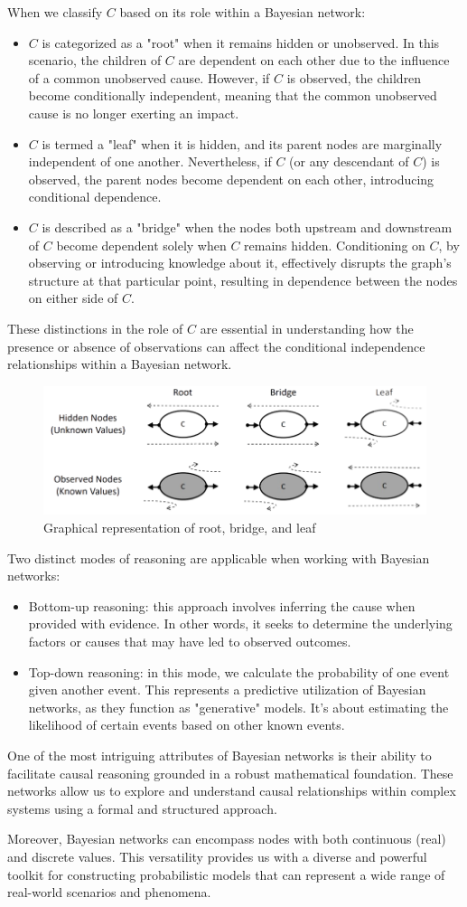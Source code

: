 When we classify $C$ based on its role within a Bayesian network:
\begin{itemize}
    \item $C$ is categorized as a "root" when it remains hidden or unobserved. 
        In this scenario, the children of $C$ are dependent on each other due to the influence of a common unobserved cause. 
        However, if $C$ is observed, the children become conditionally independent, meaning that the common unobserved cause is no longer exerting an impact.
    \item $C$ is termed a "leaf" when it is hidden, and its parent nodes are marginally independent of one another. 
        Nevertheless, if $C$ (or any descendant of $C$) is observed, the parent nodes become dependent on each other, introducing conditional dependence.
    \item $C$ is described as a "bridge" when the nodes both upstream and downstream of $C$ become dependent solely when $C$ remains hidden. 
        Conditioning on $C$, by observing or introducing knowledge about it, effectively disrupts the graph's structure at that particular point, resulting in dependence between the nodes on either side of $C$.
\end{itemize}
These distinctions in the role of $C$ are essential in understanding how the presence or absence of observations can affect the conditional independence relationships within a Bayesian network.
\begin{figure}[H]
    \centering
    \includegraphics[width=0.75\linewidth]{images/def.png}
    \caption{Graphical representation of root, bridge, and leaf}
\end{figure}

Two distinct modes of reasoning are applicable when working with Bayesian networks:
\begin{itemize}
    \item Bottom-up reasoning: this approach involves inferring the cause when provided with evidence. 
        In other words, it seeks to determine the underlying factors or causes that may have led to observed outcomes.
    \item Top-down reasoning: in this mode, we calculate the probability of one event given another event. 
        This represents a predictive utilization of Bayesian networks, as they function as "generative" models. 
        It's about estimating the likelihood of certain events based on other known events.
\end{itemize}
One of the most intriguing attributes of Bayesian networks is their ability to facilitate causal reasoning grounded in a robust mathematical foundation. 
These networks allow us to explore and understand causal relationships within complex systems using a formal and structured approach.

Moreover, Bayesian networks can encompass nodes with both continuous (real) and discrete values. 
This versatility provides us with a diverse and powerful toolkit for constructing probabilistic models that can represent a wide range of real-world scenarios and phenomena.